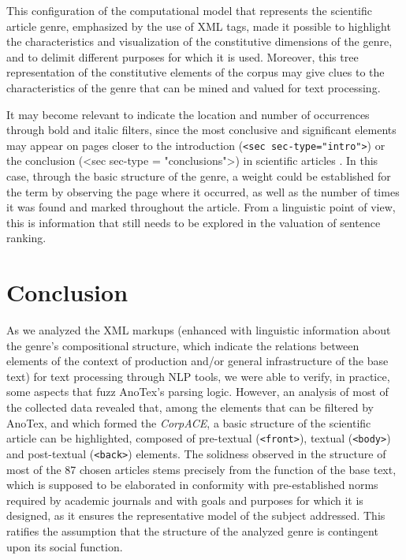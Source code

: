 \documentclass[english]{textolivre}
\begin{document}

This configuration of the computational model that represents the scientific article genre, emphasized by the use of XML tags, made it possible to highlight the characteristics and visualization of the constitutive dimensions of the genre, and to delimit different purposes for which it is used. Moreover, this tree representation of the constitutive elements of the corpus may give clues to the characteristics of the genre that can be mined and valued for text processing.

It may become relevant to indicate the location and number of occurrences through bold and italic filters, since the most conclusive and significant elements may appear on pages closer to the introduction (\texttt{<sec sec-type="intro">})  or the conclusion (<sec sec-type = "conclusions">) in scientific articles \cite{lin_identifying_1997}.
In this case, through the basic structure of the genre, a weight could be established for the term by observing the page where it occurred, as well as the number of times it was found and marked throughout the article. From a linguistic point of view, this is information that still needs to be explored in the valuation of sentence ranking.

\section{Conclusion}\label{sec-links}
As we analyzed the XML markups (enhanced with linguistic information about the genre’s compositional structure, which indicate the relations between elements of the context of production and/or general infrastructure of the base text) for text processing through NLP tools, we were able to verify, in practice, some aspects that fuzz AnoTex’s parsing logic. However, an analysis of most of the collected data revealed that, among the elements that can be filtered by AnoTex, and which formed the \textit{CorpACE}, a basic structure of the scientific article can be highlighted, composed of pre-textual (\texttt{<front>}), textual (\texttt{<body>}) and post-textual (\texttt{<back>}) elements. The solidness observed in the structure of most of the 87 chosen articles stems precisely from the function of the base text, which is supposed to be elaborated in conformity with pre-established norms required by academic journals and with goals and purposes for which it is designed, as it ensures the representative model of the subject addressed. This ratifies the assumption that the structure of the analyzed genre is contingent upon its social function.
\end{document}
